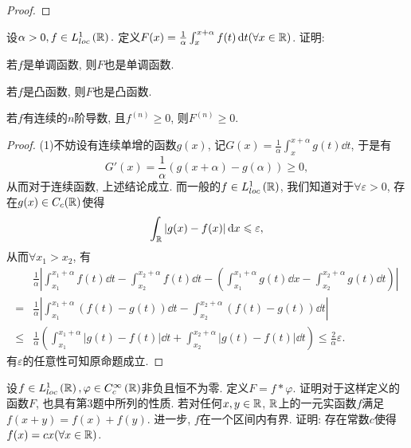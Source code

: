 \begin{quiza}
\begin{proof}
\end{proof}
\woe 设\(\alpha>0,f\in L_{loc}^1\left(\mathbb{R}\right).\) 定义\(F(x)=\frac{1}{\alpha}\int_{x}^{x+\alpha}f(t)\,\mathrm{d} t(\forall x\in\mathbb{R})\). 证明:\begin{quizs}
\item 若\(f\)是单调函数, 则\(F\)也是单调函数.
\item 若\(f\)是凸函数, 则\(F\)也是凸函数.
\item 若\(f\)有连续的\(n\)阶导数, 且\(f^{(n)}\geqslant 0\), 则\(F^{(n)}\geqslant 0\).
\end{quizs}
\begin{proof}
	(1)不妨设有连续单增的函数\(g(x)\), 记\(G(x)=\frac{1}{\alpha}\int_{x}^{x+\alpha}g(t)\dd t\), 于是有\[G'(x)=\frac{1}{\alpha}\left(g(x+\alpha)-g(\alpha)\right)\geqslant 0,\]从而对于连续函数, 上述结论成立. 而一般的\(f\in L_{loc}^1\left(\mathbb{R}\right)\), 我们知道对于\(\forall\varepsilon>0\), 存在\(g(x)\in C_c(\mathbb{R})\)使得\[\int_{\mathbb{R}}|g(x)-f(x)|\,\mathrm{d} x\leqslant\varepsilon,\]从而\(\forall x_1>x_2\), 有\[\begin{split}
		&\frac{1}{\alpha}\left|\int_{x_1}^{x_1+\alpha}f(t)\dd t-\int_{x_2}^{x_2+\alpha}f(t)\dd t-\left(\int_{x_1}^{x_1+\alpha}g(t)\dd x-\int_{x_2}^{x_2+\alpha}g(t)\dd t\right)\right|\\
		=&\frac{1}{\alpha}\left|\int_{x_1}^{x_1+\alpha}\left(f(t)-g(t)\right)\dd t-\int_{x_2}^{x_2+\alpha}\left(f(t)-g(t)\right)\dd t\right|\\
		\leqslant&\frac{1}{\alpha}\left(\int_{x_1}^{x_1+\alpha}|g(t)-f(t)|\dd t+\int_{x_2}^{x_2+\alpha}|g(t)-f(t)|\dd t\right)\leqslant\frac{2}{\alpha}\varepsilon.
	\end{split}\]
	有\(\varepsilon\)的任意性可知原命题成立.
\end{proof}
\woe 设\(f\in L_{loc}^{1}\left(\mathbb{R}\right),\varphi\in C_{c}^{\infty}\left(\mathbb{R}\right)\)非负且恒不为零. 定义\(F=f*\varphi\). 证明对于这样定义的函数\(F\), 也具有第3题中所列的性质.
\woe 若对任何\(x,y\in\mathbb{R}\), \(\mathbb{R}\)上的一元实函数\(f\)满足\(f(x+y)=f(x)+f(y)\). 进一步, \(f\)在一个区间内有界. 证明: 存在常数\(c\)使得\(f(x)=cx(\forall x\in\mathbb{R})\).
\end{quiza}
